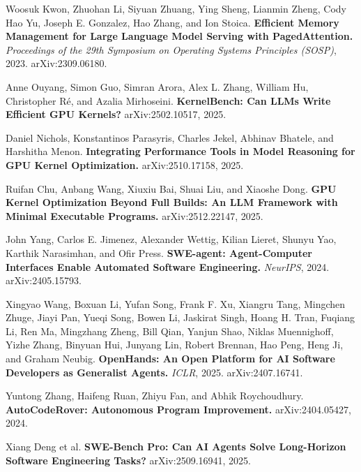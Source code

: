 \documentclass[11pt]{article}
\begin{document}
\begin{enumerate}[leftmargin=2em,itemsep=3pt,label={[\arabic*]}]
  \item Woosuk Kwon, Zhuohan Li, Siyuan Zhuang, Ying Sheng, Lianmin Zheng, Cody Hao Yu, Joseph E. Gonzalez, Hao Zhang, and Ion Stoica. \textbf{Efficient Memory Management for Large Language Model Serving with PagedAttention.} \emph{Proceedings of the 29th Symposium on Operating Systems Principles (SOSP)}, 2023. arXiv:2309.06180.

  \item Anne Ouyang, Simon Guo, Simran Arora, Alex L. Zhang, William Hu, Christopher R\'{e}, and Azalia Mirhoseini. \textbf{KernelBench: Can LLMs Write Efficient GPU Kernels?} arXiv:2502.10517, 2025.

  \item Daniel Nichols, Konstantinos Parasyris, Charles Jekel, Abhinav Bhatele, and Harshitha Menon. \textbf{Integrating Performance Tools in Model Reasoning for GPU Kernel Optimization.} arXiv:2510.17158, 2025.

  \item Ruifan Chu, Anbang Wang, Xiuxiu Bai, Shuai Liu, and Xiaoshe Dong. \textbf{GPU Kernel Optimization Beyond Full Builds: An LLM Framework with Minimal Executable Programs.} arXiv:2512.22147, 2025.

  \item John Yang, Carlos E. Jimenez, Alexander Wettig, Kilian Lieret, Shunyu Yao, Karthik Narasimhan, and Ofir Press. \textbf{SWE-agent: Agent-Computer Interfaces Enable Automated Software Engineering.} \emph{NeurIPS}, 2024. arXiv:2405.15793.

  \item Xingyao Wang, Boxuan Li, Yufan Song, Frank F. Xu, Xiangru Tang, Mingchen Zhuge, Jiayi Pan, Yueqi Song, Bowen Li, Jaskirat Singh, Hoang H. Tran, Fuqiang Li, Ren Ma, Mingzhang Zheng, Bill Qian, Yanjun Shao, Niklas Muennighoff, Yizhe Zhang, Binyuan Hui, Junyang Lin, Robert Brennan, Hao Peng, Heng Ji, and Graham Neubig. \textbf{OpenHands: An Open Platform for AI Software Developers as Generalist Agents.} \emph{ICLR}, 2025. arXiv:2407.16741.

  \item Yuntong Zhang, Haifeng Ruan, Zhiyu Fan, and Abhik Roychoudhury. \textbf{AutoCodeRover: Autonomous Program Improvement.} arXiv:2404.05427, 2024.

  \item Xiang Deng et al. \textbf{SWE-Bench Pro: Can AI Agents Solve Long-Horizon Software Engineering Tasks?} arXiv:2509.16941, 2025.


\end{enumerate}
\end{document}
